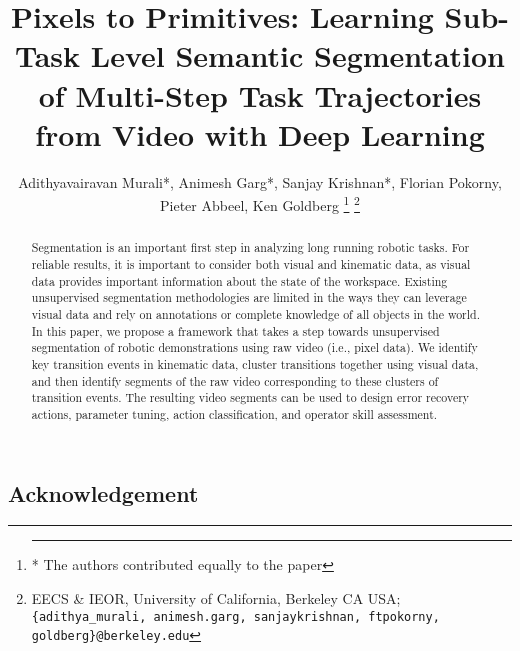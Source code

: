 \documentclass[letterpaper, 10 pt, conference]{ieeeconf}
\title{\LARGE \bf
Pixels to Primitives: Learning Sub-Task Level Semantic Segmentation \\
of Multi-Step Task Trajectories from Video with Deep Learning }
\author{%
Adithyavairavan Murali*, Animesh Garg*, Sanjay Krishnan*, Florian Pokorny, Pieter Abbeel, Ken Goldberg
\thanks{\hrule \vspace{5pt} * The authors contributed equally to the paper}%
\thanks{EECS \& IEOR, University of California, Berkeley CA USA; \texttt{\{adithya\_murali, animesh.garg, sanjaykrishnan, ftpokorny, goldberg\}@berkeley.edu}}%
}
\begin{document}
\maketitle

\begin{abstract}
Segmentation is an important first step in analyzing long running robotic tasks. For reliable results, it is important to consider both visual and kinematic data, as visual data provides important information about the state of the workspace. 
Existing unsupervised segmentation methodologies are limited in the ways they can leverage visual data and rely on annotations or complete knowledge of all objects in the world. In this paper, we propose a framework that takes a step towards unsupervised segmentation of robotic demonstrations using raw video (i.e., pixel data). 
We identify key transition events in kinematic data, cluster transitions together using visual data, and then identify segments of the raw video corresponding to these clusters of transition events. 
The resulting video segments can be used to design error recovery actions, parameter tuning, action classification, 
and operator skill assessment. 
\end{abstract} 










\subsection*{Acknowledgement}




\end{document}
